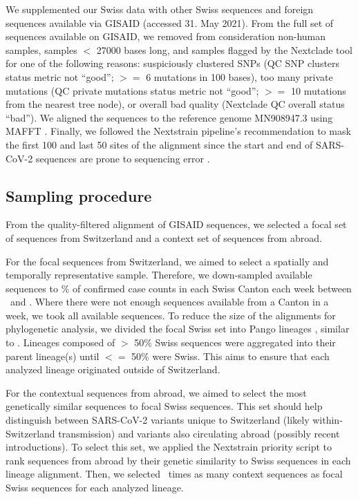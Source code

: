\documentclass[9pt,twoside,lineno]{pnas-new}
\newcommand{\maxsamplingpercent}{\maxsamplingfraction*100}
\begin{document}
We supplemented our Swiss data with other Swiss sequences and foreign sequences available via GISAID (accessed 31. May 2021). From the full set of sequences available on GISAID, we removed from consideration non-human samples, samples $<$ 27000 bases long, and samples flagged by the Nextclade tool \cite{Aksamentov} for one of the following reasons: suspiciously clustered SNPs (QC SNP clusters status metric not ``good''; $>=$ 6 mutations in 100 bases), too many private mutations (QC private mutations status metric not ``good''; $>=$ 10 mutations from the nearest tree node), or overall bad quality (Nextclade QC overall status ``bad''). We aligned the sequences to the reference genome MN908947.3 using MAFFT \cite{katoh_mafft:_2002}. Finally, we followed the Nextstrain pipeline's recommendation to mask the first 100 and last 50 sites of the alignment \cite{Nextstraina} since the start and end of SARS-CoV-2 sequences are prone to sequencing error \cite{DeMaio2020}.

\subsection{Sampling procedure}

From the quality-filtered alignment of GISAID sequences, we selected a focal set of sequences from Switzerland and a context set of sequences from abroad. 

For the focal sequences from Switzerland, we aimed to select a spatially and temporally representative sample. Therefore, we down-sampled available sequences to \fpeval{\maxsamplingpercent}\% of confirmed case counts in each Swiss Canton each week between \mindate\ and \maxdate. Where there were not enough sequences available from a Canton in a week, we took all available sequences. To reduce the size of the alignments for phylogenetic analysis, we divided the focal Swiss set into Pango lineages \cite{Rambaut}, similar to \cite{DuPlessis2021}. Lineages composed of $>$ 50\% Swiss sequences were aggregated into their parent lineage(s) until $<=$ 50\% were Swiss. This aims to ensure that each analyzed lineage originated outside of Switzerland.

For the contextual sequences from abroad, we aimed to select the most genetically similar sequences to focal Swiss sequences. This set should help distinguish between SARS-CoV-2 variants unique to Switzerland (likely within-Switzerland transmission) and variants also circulating abroad (possibly recent introductions). To select this set, we applied the Nextstrain priority script \cite{Nextstrainteam} to rank sequences from abroad by their genetic similarity to Swiss sequences in each lineage alignment. Then, we selected \similaritycontextscalefactor\ times as many  context sequences as focal Swiss sequences for each analyzed lineage. 
\end{document}
